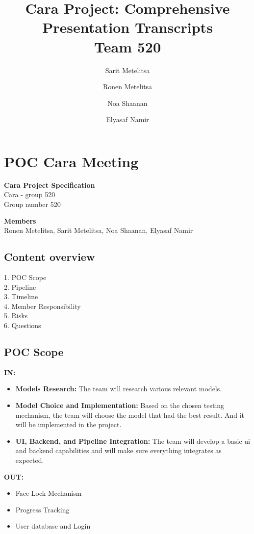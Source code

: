 \documentclass[12pt,a4paper]{article}
\title{\textbf{Cara Project: Comprehensive Presentation Transcripts}\\ \Large Team 520}
\author{Sarit Metelitsa \and Ronen Metelitsa \and Noa Shaanan \and Elyasaf Namir}
\date{}
\begin{document}
\maketitle
\tableofcontents
\newpage

\section{POC Cara Meeting}

\textbf{Cara Project Specification}\\
Cara - group 520\\
Group number 520

\textbf{Members}\\
Ronen Metelitsa, Sarit Metelitsa, Noa Shaanan, Elyasaf Namir

\subsection{Content overview}
1. POC Scope\\
2. Pipeline\\
3. Timeline\\
4. Member Responsibility\\
5. Risks\\
6. Questions

\subsection{POC Scope}
\textbf{IN:}
\begin{itemize}
    \item \textbf{Models Research:} The team will research various relevant models.
    \item \textbf{Model Choice and Implementation:} Based on the chosen testing mechanism, the team will choose the model that had the best result. And it will be implemented in the project.
    \item \textbf{UI, Backend, and Pipeline Integration:} The team will develop a basic ui and backend capabilities and will make sure everything integrates as expected.
\end{itemize}

\textbf{OUT:}
\begin{itemize}
    \item Face Lock Mechanism
    \item Progress Tracking
    \item User database and Login
\end{itemize}
\end{document}
